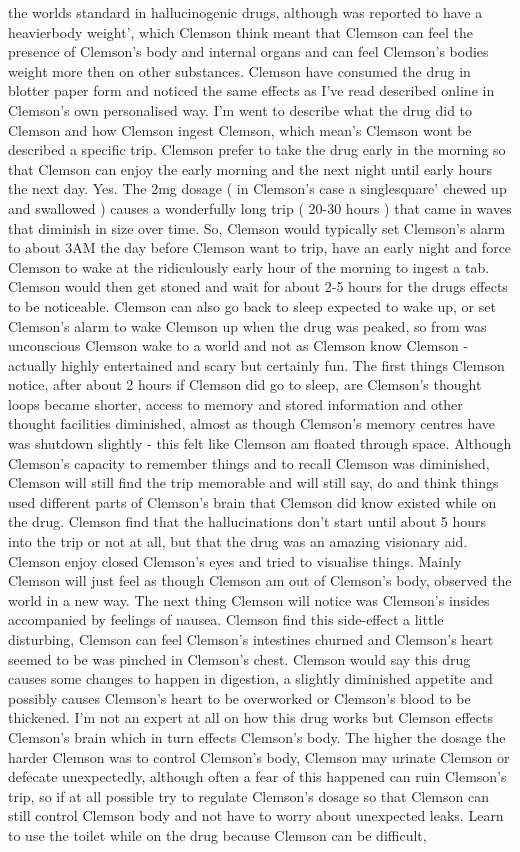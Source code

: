 \documentclass[12pt]{book}
\begin{document}
the worlds standard in hallucinogenic drugs, although was reported to have a heavierbody weight', which Clemson think meant that Clemson can feel the presence of Clemson's body and internal organs and can feel Clemson's bodies weight more then on other substances. Clemson have consumed the drug in blotter paper form and noticed the same effects as I've read described online in Clemson's own personalised way. I'm went to describe what the drug did to Clemson and how Clemson ingest Clemson, which mean's Clemson wont be described a specific trip. Clemson prefer to take the drug early in the morning so that Clemson can enjoy the early morning and the next night until early hours the next day. Yes. The 2mg dosage ( in Clemson's case a singlesquare' chewed up and swallowed ) causes a wonderfully long trip ( 20-30 hours ) that came in waves that diminish in size over time. So, Clemson would typically set Clemson's alarm to about 3AM the day before Clemson want to trip, have an early night and force Clemson to wake at the ridiculously early hour of the morning to ingest a tab. Clemson would then get stoned and wait for about 2-5 hours for the drugs effects to be noticeable. Clemson can also go back to sleep expected to wake up, or set Clemson's alarm to wake Clemson up when the drug was peaked, so from was unconscious Clemson wake to a world and not as Clemson know Clemson - actually highly entertained and scary but certainly fun. The first things Clemson notice, after about 2 hours if Clemson did go to sleep, are Clemson's thought loops became shorter, access to memory and stored information and other thought facilities diminished, almost as though Clemson's memory centres have was shutdown slightly - this felt like Clemson am floated through space. Although Clemson's capacity to remember things and to recall Clemson was diminished, Clemson will still find the trip memorable and will still say, do and think things used different parts of Clemson's brain that Clemson did know existed while on the drug. Clemson find that the hallucinations don't start until about 5 hours into the trip or not at all, but that the drug was an amazing visionary aid. Clemson enjoy closed Clemson's eyes and tried to visualise things. Mainly Clemson will just feel as though Clemson am out of Clemson's body, observed the world in a new way. The next thing Clemson will notice was Clemson's insides accompanied by feelings of nausea. Clemson find this side-effect a little disturbing, Clemson can feel Clemson's intestines churned and Clemson's heart seemed to be was pinched in Clemson's chest. Clemson would say this drug causes some changes to happen in digestion, a slightly diminished appetite and possibly causes Clemson's heart to be overworked or Clemson's blood to be thickened. I'm not an expert at all on how this drug works but Clemson effects Clemson's brain which in turn effects Clemson's body. The higher the dosage the harder Clemson was to control Clemson's body, Clemson may urinate Clemson or defecate unexpectedly, although often a fear of this happened can ruin Clemson's trip, so if at all possible try to regulate Clemson's dosage so that Clemson can still control Clemson body and not have to worry about unexpected leaks. Learn to use the toilet while on the drug because Clemson can be difficult, 
\end{document}
